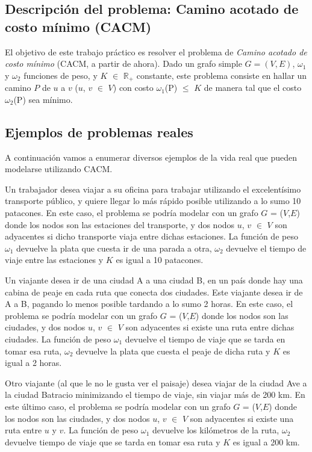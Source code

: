 \subsection{Descripción del problema: Camino acotado de costo mínimo (CACM)}
\label{sub:introduccion-descripcion}

El objetivo de este trabajo práctico es resolver el problema de \emph{Camino acotado de costo mínimo} (CACM, a partir de ahora). Dado un grafo simple $G = (V,E)$, $\omega_1$ y $\omega_2$ funciones de peso, y $K$ $\in$ $\mathbb{R}_+$ constante, este problema consiste en hallar un camino $P$ de $u$ a $v$ ($u$, $v$ $\in$ $V$) con costo $\omega_1$(P) $\leq$ $K$ de manera tal que el costo $\omega_2$(P) sea mínimo.

\subsection{Ejemplos de problemas reales}
\label{sub:introduccion-ejemplos}

A continuación vamos a enumerar diversos ejemplos de la vida real que pueden modelarse utilizando CACM.

Un trabajador desea viajar a su oficina para trabajar utilizando el excelentísimo transporte público, y quiere llegar lo más rápido posible utilizando a lo sumo 10 patacones. En este caso, el problema se podría modelar con un grafo $G$ = ($V$,$E$) donde los nodos son las estaciones del transporte, y dos nodos $u$, $v$ $\in$ $V$ son adyacentes si dicho transporte viaja entre dichas estaciones. La función de peso $\omega_1$ devuelve la plata que cuesta ir de una parada a otra, $\omega_2$ devuelve el tiempo de viaje entre las estaciones y $K$ es igual a 10 patacones.

Un viajante desea ir de una ciudad A a una ciudad B, en un país donde hay una cabina de peaje en cada ruta que conecta dos ciudades. Este viajante desea ir de A a B, pagando lo menos posible tardando a lo sumo 2 horas. En este caso, el problema se podría modelar con un grafo $G$ = ($V$,$E$) donde los nodos son las ciudades, y dos nodos $u$, $v$ $\in$ $V$ son adyacentes si existe una ruta entre dichas ciudades. La función de peso $\omega_1$ devuelve el tiempo de viaje que se tarda en tomar esa ruta, $\omega_2$ devuelve la plata que cuesta el peaje de dicha ruta y $K$ es igual a 2 horas.

Otro viajante (al que le no le gusta ver el paisaje) desea viajar de la ciudad Ave a la ciudad Batracio minimizando el tiempo de viaje, sin viajar más de 200 km. En este último caso, el problema se podría modelar con un grafo $G$ = ($V$,$E$) donde los nodos son las ciudades, y dos nodos $u$, $v$ $\in$ $V$ son adyacentes si existe una ruta entre $u$ y $v$. La función de peso $\omega_1$ devuelve los kilómetros de la ruta, $\omega_2$ devuelve tiempo de viaje que se tarda en tomar esa ruta y $K$ es igual a 200 km.

